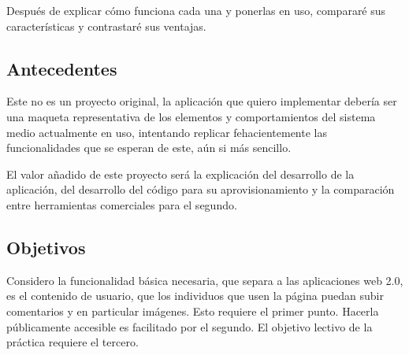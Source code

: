 \documentclass[11pt]{article}
\begin{document}
\begin{flushleft}
Después de explicar cómo funciona cada una y ponerlas en uso, compararé sus características y contrastaré sus ventajas.

    \bigskip
    \bigskip
    
	\subsection{Antecedentes}
	Este no es un proyecto original, la aplicación que quiero implementar debería ser una maqueta representativa de los elementos y comportamientos del sistema medio actualmente en uso, intentando replicar fehacientemente las funcionalidades que se esperan de este, aún si más sencillo. 
    \linebreak
    
    El valor añadido de este proyecto será la explicación del desarrollo de la aplicación, del desarrollo del código para su aprovisionamiento y la comparación entre herramientas comerciales para el segundo.

	\clearpage
	\subsection{Objetivos}
    Considero la funcionalidad básica necesaria, que separa a las aplicaciones web 2.0, es el contenido de usuario, que los individuos que usen la página puedan subir comentarios y en particular imágenes. Esto requiere el primer punto. Hacerla públicamente accesible es facilitado por el segundo. El objetivo lectivo de la práctica requiere el tercero.
    

\end{flushleft}
\end{document}
